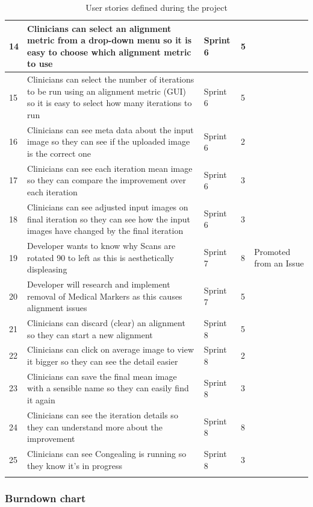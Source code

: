 \begin{center}
\begin{longtable}{| p{2cm} | p{4cm} | p{2cm}  | p{2cm} | p{3cm} |}
      14 & Clinicians can select an alignment metric from a drop-down menu so it is easy to choose which alignment metric to use & Sprint 6 & 5 & \\ \hline
      15 & Clinicians can select the number of iterations to be run using an alignment metric (GUI) so it is easy to select how many iterations to run & Sprint 6 & 5 & \\ \hline
      16 & Clinicians can see meta data about the input image so they can see if the uploaded image is the correct one & Sprint 6 & 2 & \\ \hline
      17 & Clinicians can see each iteration mean image so they can compare the improvement over each iteration & Sprint 6 & 3 & \\ \hline
      18 & Clinicians can see adjusted input images on final iteration so they can see how the input images have changed by the final iteration & Sprint 6 & 3 & \\ \hline
      19 & Developer wants to know why Scans are rotated 90 to left as this is aesthetically displeasing & Sprint 7 & 8 & Promoted from an Issue \\ \hline
      20 & Developer will research and implement removal of Medical Markers as this causes alignment issues & Sprint 7 & 5 & \\ \hline
      21 & Clinicians can discard (clear) an alignment so they can start a new alignment & Sprint 8 & 5 & \\ \hline
      22 & Clinicians can click on average image to view it bigger so they can see the detail easier & Sprint 8 & 2 & \\ \hline
      23 & Clinicians can save the final mean image with a sensible name so they can easily find it again & Sprint 8 & 3 & \\ \hline
      24 & Clinicians can see the iteration details so they can understand more about the improvement & Sprint 8 & 8 & \\ \hline
      25 & Clinicians can see \Gls{Congealing} is running so they know it's in progress & Sprint 8 & 3 & \\ \hline
  \caption{User stories defined during the project}
  \label{table:User Stories}
\end{longtable}
\end{center}

\subsubsection{Burndown chart}

